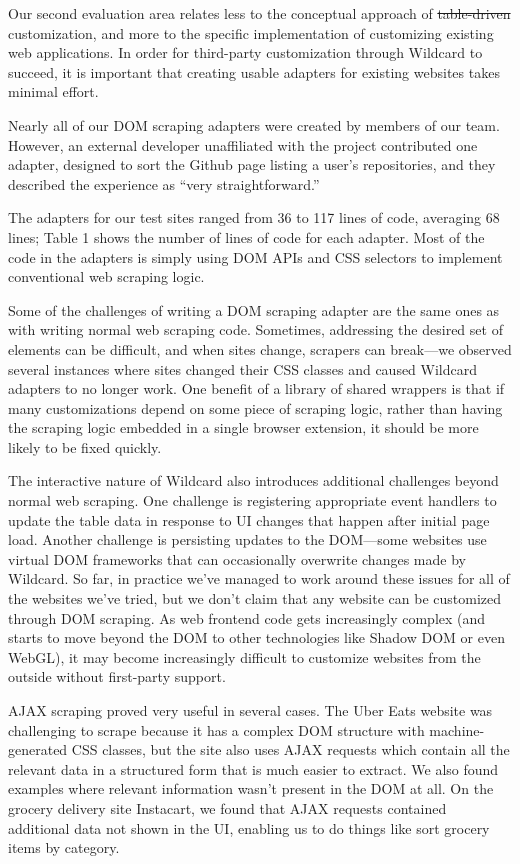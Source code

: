 \documentclass[sigplan,screen,10pt,anonymous,review]{acmart}
\providecommand{\DIFadd}[1]{{\protect\color{blue}\uwave{#1}}} %
\providecommand{\DIFdel}[1]{{\protect\color{red}\sout{#1}}}                      %
\providecommand{\DIFaddbegin}{} %
\providecommand{\DIFaddend}{} %
\providecommand{\DIFdelbegin}{} %
\providecommand{\DIFdelend}{} %
\begin{document}
Our second evaluation area relates less to the conceptual approach of
\DIFdelbegin \DIFdel{table-driven }\DIFdelend \DIFaddbegin \DIFadd{data-driven }\DIFaddend customization, and more to the specific implementation of
customizing existing web applications. In order for third-party
customization through Wildcard to succeed, it is important that creating
usable adapters for existing websites takes minimal effort.

Nearly all of our DOM scraping adapters were created by members of our
team. However, an external developer unaffiliated with the project
contributed one adapter, designed to sort the Github page listing a
user's repositories, and they described the experience as ``very
straightforward.''

The adapters for our test sites ranged from 36 to 117 lines of code,
averaging 68 lines; Table 1 shows the number of lines of code for each
adapter. Most of the code in the adapters is simply using DOM APIs and
CSS selectors to implement conventional web scraping logic.

Some of the challenges of writing a DOM scraping adapter are the same
ones as with writing normal web scraping code. Sometimes, addressing the
desired set of elements can be difficult, and when sites change,
scrapers can break---we observed several instances where sites changed
their CSS classes and caused Wildcard adapters to no longer work. One
benefit of a library of shared wrappers is that if many customizations
depend on some piece of scraping logic, rather than having the scraping
logic embedded in a single browser extension, it should be more likely
to be fixed quickly.

The interactive nature of Wildcard also introduces additional challenges
beyond normal web scraping. One challenge is registering appropriate
event handlers to update the table data in response to UI changes that
happen after initial page load. Another challenge is persisting updates
to the DOM---some websites use virtual DOM frameworks that can
occasionally overwrite changes made by Wildcard. So far, in practice
we've managed to work around these issues for all of the websites we've
tried, but we don't claim that any website can be customized through DOM
scraping. As web frontend code gets increasingly complex (and starts to
move beyond the DOM to other technologies like Shadow DOM or even
WebGL), it may become increasingly difficult to customize websites from
the outside without first-party support.

AJAX scraping proved very useful in several cases. The Uber Eats website
was challenging to scrape because it has a complex DOM structure with
machine-generated CSS classes, but the site also uses AJAX requests
which contain all the relevant data in a structured form that is much
easier to extract. We also found examples where relevant information
wasn't present in the DOM at all. On the grocery delivery site
Instacart, we found that AJAX requests contained additional data not
shown in the UI, enabling us to do things like sort grocery items by
category.
\end{document}
